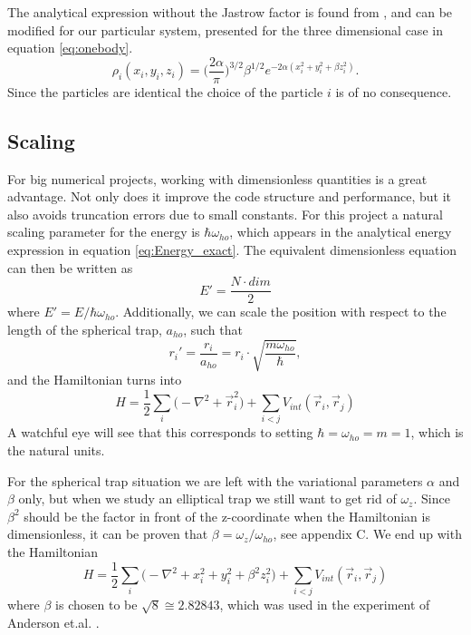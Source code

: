 \documentclass[norsk,a4paper,12pt]{article}
\begin{document}
The analytical expression without the Jastrow factor is found from \cite{DuBois}, and can be modified for our particular system, presented for the three dimensional case in equation \ref{eq:onebody}.
\begin{equation}
\rho_i(x_i, y_i, z_i)=\bigg(\frac{2\alpha}{\pi}\bigg)^{3/2}\beta^{1/2}e^{-2\alpha(x_i^2+y_i^2+\beta z_i^2)}.
\label{eq:onebody}
\end{equation}
Since the particles are identical the choice of the particle $i$ is of no consequence. 

\subsection{Scaling} \label{sec:scaling}
For big numerical projects, working with dimensionless quantities is a great advantage. Not only does it improve the code structure and performance, but it also avoids truncation errors due to small constants. For this project a natural scaling parameter for the energy is $\hbar\omega_{ho}$, which appears in the analytical energy expression in equation \ref{eq:Energy_exact}. The equivalent dimensionless equation can then be written as
\begin{equation}
E'=\frac{N\cdot dim}{2}
\end{equation}
where $E'=E/\hbar\omega_{ho}$. Additionally, we can scale the position with respect to the length of the spherical trap, $a_{ho}$, such that 
\begin{equation}
r_i'=\frac{r_i}{a_{ho}}=r_i\cdot\sqrt{\frac{m\omega_{ho}}{\hbar}},
\end{equation}
and the Hamiltonian turns into
\begin{equation}
H=\frac{1}{2}\sum_i\Big(-\nabla^2 + \vec{r}_i^2\Big)+\sum_{i<j}V_{int}(\vec{r}_i,\vec{r}_j)
\label{eq:scaled_hamiltonian}
\end{equation}
A watchful eye will see that this corresponds to setting $\hbar=\omega_{ho}=m=1$, which is the natural units. 

For the spherical trap situation we are left with the variational parameters $\alpha$ and $\beta$ only, but when we study an elliptical trap we still want to get rid of $\omega_z$. Since $\beta^2$ should be the factor in front of the z-coordinate when the Hamiltonian is dimensionless, it can be proven that $\beta=\omega_z/\omega_{ho}$, see appendix C. We end up with the Hamiltonian
\begin{equation}
H=\frac{1}{2}\sum_i\Big(-\nabla^2 + x_i^2 + y_i^2 + \beta^2z_i^2\Big)+\sum_{i<j}V_{int}(\vec{r}_i,\vec{r}_j)
\end{equation} 
where $\beta$ is chosen to be $\sqrt{8}\cong2.82843$, which was used in the experiment of Anderson et.al. \cite{Anderson}.
\end{document}

